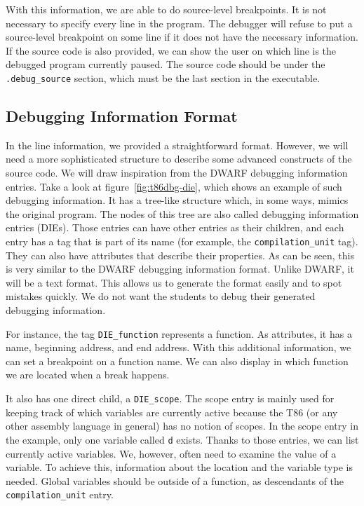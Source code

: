 With this information, we are able to do source-level breakpoints. It is not
necessary to specify every line in the program. The debugger will refuse to put
a source-level breakpoint on some line if it does not have the necessary
information. If the source code is also provided, we can show the user on which
line is the debugged program currently paused. The source code should be under
the \verb|.debug_source| section, which must be the last section in the
executable.

\subsection{Debugging Information Format}
In the line information, we provided a straightforward format. However, we will
need a more sophisticated structure to describe some advanced constructs of the
source code. We will draw inspiration from the DWARF debugging information entries.
Take a look at figure~\ref{fig:t86dbg-die}, which shows an example of such
debugging information. It has a tree-like structure which, in some ways, mimics
the original program. The nodes of this tree are also called debugging
information entries (DIEs). Those entries can have other entries as their
children, and each entry has a tag that is part of its name (for example, the
\verb|compilation_unit| tag). They can also have attributes that describe their
properties. As can be seen, this is very similar to the DWARF debugging
information format. Unlike DWARF, it will be a text format. This allows us to
generate the format easily and to spot mistakes quickly. We do not want the
students to debug their generated debugging information.

For instance, the tag \verb|DIE_function| represents a function. As attributes,
it has a name, beginning address, and end address. With this additional
information, we can set a breakpoint on a function name. We can also display in
which function we are located when a break happens.

It also has one direct child, a \verb|DIE_scope|. The scope entry is mainly
used for keeping track of which variables are currently active because the T86
(or any other assembly language in general) has no notion of scopes. In the
scope entry in the example, only one variable called \texttt{d} exists. Thanks
to those entries, we can list currently active variables. We, however, often
need to examine the value of a variable. To achieve this, information about the
location and the variable type is needed. Global variables should be outside of
a function, as descendants of the \verb|compilation_unit| entry.

